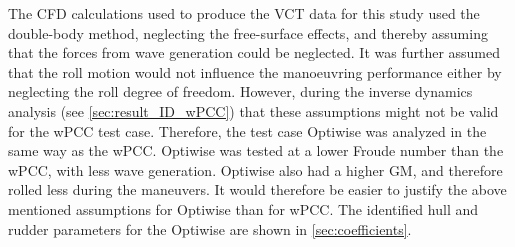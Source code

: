 \noindent The CFD calculations used to produce the VCT data for this study used the double-body method, neglecting the free-surface effects, and thereby assuming that the forces from wave generation could be neglected. It was further assumed that the roll motion would not influence the manoeuvring performance either by neglecting the roll degree of freedom.
However, during the inverse dynamics analysis (see \autoref{sec:result_ID_wPCC}) that these assumptions might not be valid for the wPCC test case. 
Therefore, the test case Optiwise was analyzed in the same way as the wPCC. Optiwise was tested at a lower Froude number than the wPCC, with less wave generation. Optiwise also had a higher GM, and therefore rolled less during the maneuvers. It would therefore be easier to justify the above mentioned assumptions for Optiwise than for wPCC. 
The identified hull and rudder parameters for the Optiwise are shown in \autoref{sec:coefficients}.